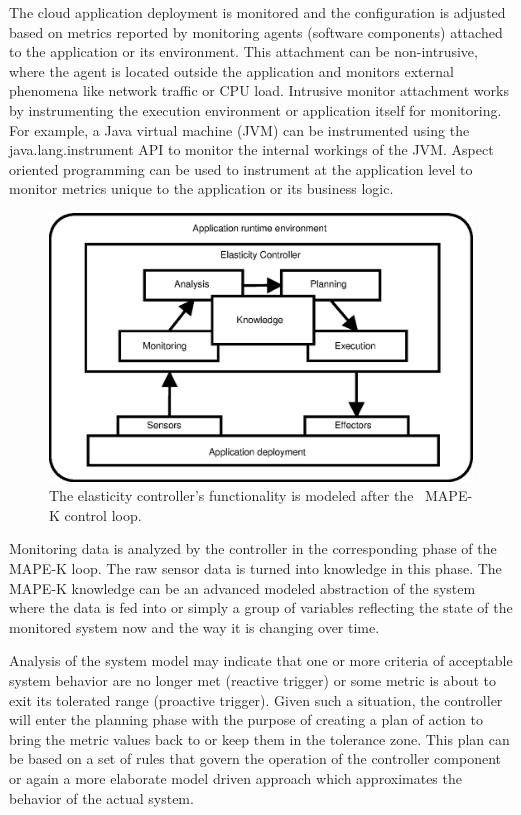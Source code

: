 \documentclass[english]{tktltiki2}
\theoremstyle{definition}
\theoremstyle{remark}
\begin{document}
The cloud application deployment is monitored and the configuration is adjusted
based on metrics reported by monitoring agents (software components) attached to
the application or its environment. This attachment can be non-intrusive, where
the agent is located outside the application and monitors external phenomena
like network traffic or CPU load. Intrusive monitor attachment works by
instrumenting the execution environment or application itself for monitoring.
For example, a Java virtual machine (JVM) can be instrumented using the
java.lang.instrument API to monitor the internal workings of the JVM. Aspect
oriented programming can be used to instrument at the application level to
monitor metrics unique to the application or its business logic.

\begin{figure}[h!]
	\includegraphics[width=\textwidth]{images/mape-k}
	\caption{The elasticity controller's functionality is modeled after the \mbox{
	MAPE-K} control loop.}
	\label{fig:mape-k}
\end{figure}

Monitoring data is analyzed by the controller in the corresponding phase of the
MAPE-K loop. The raw sensor data is turned into knowledge in this phase. The
MAPE-K knowledge can be an advanced modeled abstraction of the system where the
data is fed into or simply a group of variables reflecting the state of the
monitored system now and the way it is changing over time.

Analysis of the system model may indicate that one or more criteria of
acceptable system behavior are no longer met (reactive trigger) or some metric
is about to exit its tolerated range (proactive trigger). Given such a
situation, the controller will enter the planning phase with the purpose of creating
a plan of action to bring the metric values back to or keep them in the
tolerance zone. This plan can be based on a set of rules that govern the
operation of the controller component or again a more elaborate model driven
approach which approximates the behavior of the actual system.
\end{document}
